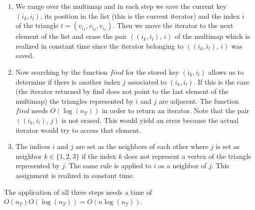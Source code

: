 \documentclass[10pt]{article}
\begin{document}
 \begin{enumerate}
 	\item 
 	We range over the multimap and in each step we save the current key $ (i_k,i_l) $, its position in the list (this is the current iterator) and the index $ i $ of the triangle $ t = (v_{i_1},v_{i_2},v_{i_3})  $. Then we move the iterator to the next element of the list and erase the pair $ ( (i_k,i_l), \, i) $ of the multimap which is realized in constant time since the iterator belonging to $ ( (i_k,i_l), \, i) $ was saved. 
 	\item 
 	Now searching by the function $ find $ for the stored key $ (i_k,i_l) $ allows us to determine if there is another index $ j $ associated to $ (i_k,i_l) $. If this is the case (the iterator returned by find does not point to the last element of the multimap) the triangles represented by $i$ and $j$ are adjacent. The function  $ find $ needs $ O(\log(n_T)) $ in order to return an iterator. 
 	Note that the pair $ ( (i_k,i_l), \, j) $ is not erased. This would yield an error because the actual iterator would try to access that element. 
 	\item 
 	The indices $ i $ and $ j $ are set as the neighbors of each other where $ j $ is set as neighbor $ k \in \{1,2,3\} $ if the index $k$ does not represent a vertex of the triangle represented by $ j $. The same rule is applied to $ i $ as a neighbor of $ j $. 
 	This assignment is realized in constant time. 
  \end{enumerate}
The application of all three steps needs a time of $ O(n_T)O(\log(n_T)) = O(n\log(n_T)) $. 
\end{document}
